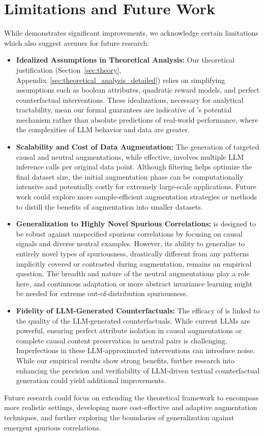 \section{Limitations and Future Work}
\label{sec:limitations_future_work}

While \carma{} demonstrates significant improvements, we acknowledge certain limitations which also suggest avenues for future research:

\begin{itemize}[left=10pt, itemsep=2pt, topsep=3pt]
    \item \textbf{Idealized Assumptions in Theoretical Analysis:}
    Our theoretical justification (Section~\ref{sec:theory}, Appendix~\ref{sec:theoretical_analysis_detailed}) relies on simplifying assumptions such as boolean attributes, quadratic reward models, and perfect counterfactual interventions. These idealizations, necessary for analytical tractability, mean our formal guarantees are indicative of \carma{}'s potential mechanism rather than absolute predictions of real-world performance, where the complexities of LLM behavior and data are greater.

    \item \textbf{Scalability and Cost of Data Augmentation:}
    The generation of targeted causal and neutral augmentations, while effective, involves multiple LLM inference calls per original data point. Although filtering helps optimize the final dataset size, the initial augmentation phase can be computationally intensive and potentially costly for extremely large-scale applications. Future work could explore more sample-efficient augmentation strategies or methods to distill the benefits of augmentation into smaller datasets.

    \item \textbf{Generalization to Highly Novel Spurious Correlations:}
    \carma{} is designed to be robust against unspecified spurious correlations by focusing on causal signals and diverse neutral examples. However, its ability to generalize to entirely novel types of spuriousness, drastically different from any patterns implicitly covered or contrasted during augmentation, remains an empirical question. The breadth and nature of the neutral augmentations play a role here, and continuous adaptation or more abstract invariance learning might be needed for extreme out-of-distribution spuriousness.

    \item \textbf{Fidelity of LLM-Generated Counterfactuals:}
    The efficacy of \carma{} is linked to the quality of the LLM-generated counterfactuals. While current LLMs are powerful, ensuring perfect attribute isolation in causal augmentations or complete causal content preservation in neutral pairs is challenging. Imperfections in these LLM-approximated interventions can introduce noise. While our empirical results show strong benefits, further research into enhancing the precision and verifiability of LLM-driven textual counterfactual generation could yield additional improvements.
\end{itemize}

Future research could focus on extending the theoretical framework to encompass more realistic settings, developing more cost-effective and adaptive augmentation techniques, and further exploring the boundaries of generalization against emergent spurious correlations.
